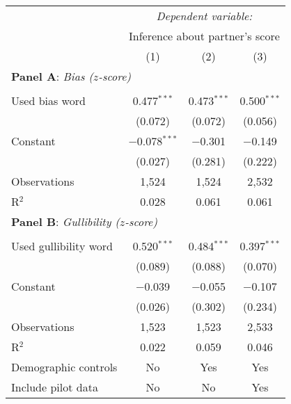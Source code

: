 \begin{table}[!htbp] \centering 
  \label{t:1-validation}
\begin{threeparttable}
\begin{tabular}{@{\hspace{5pt}}l@{\hspace{5pt}}ccc} 
\toprule 
 & \multicolumn{3}{c}{\textit{Dependent variable:}} \\ 
\cmidrule(rr){2-4} 
 & \multicolumn{3}{c}{Inference about partner's score} \\ 
 \cmidrule(lr){2-4}
 & (1) & (2) & (3)\\ 
\midrule
\multicolumn{4}{l}{\textbf{Panel A}: \textit{Bias ($z$-score)}} \\
\midrule
\\[-2.1ex] Used bias word & 0.477$^{***}$ & 0.473$^{***}$ & 0.500$^{***}$ \\ 
  & (0.072) & (0.072) & (0.056) \\ 
 \addlinespace 
 Constant & $-$0.078$^{***}$ & $-$0.301 & $-$0.149 \\ 
  & (0.027) & (0.281) & (0.222) \\ 
 \addlinespace 
\midrule  
Observations & 1,524 & 1,524 & 2,532 \\ 
R$^{2}$ & 0.028 & 0.061 & 0.061 \\ 
\midrule
\multicolumn{4}{l}{\textbf{Panel B}: \textit{Gullibility ($z$-score)}} \\
\midrule
\\[-2.1ex] Used gullibility word & 0.520$^{***}$ & 0.484$^{***}$ & 0.397$^{***}$ \\ 
  & (0.089) & (0.088) & (0.070) \\ 
 \addlinespace 
 Constant & $-$0.039 & $-$0.055 & $-$0.107 \\ 
  & (0.026) & (0.302) & (0.234) \\ 
 \addlinespace 
\midrule  
Observations & 1,523 & 1,523 & 2,533 \\ 
R$^{2}$ & 0.022 & 0.059 & 0.046 \\ 
\midrule
Demographic controls & No & Yes & Yes \\ 
Include pilot data & No & No & Yes\\
\bottomrule 
\end{tabular} 
\end{threeparttable}
\end{table} 
